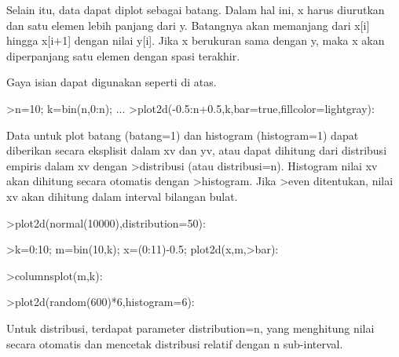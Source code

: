\documentclass{article}
\begin{document}
\begin{eulernotebook}
\begin{eulercomment}
\begin{eulercomment}
\begin{eulercomment}
\begin{eulercomment}
\begin{eulercomment}
\begin{eulercomment}
\begin{eulerprompt}
\end{eulerprompt}
\begin{eulercomment}
Selain  itu,  data  dapat  diplot  sebagai  batang.  Dalam  hal  ini,
x harus  diurutkan  dan  satu  elemen  lebih  panjang  dari  y.
Batangnya akan memanjang  dari  x[i]  hingga  x[i+1]  dengan  nilai
y[i].  Jika  x  berukuran  sama  dengan  y,  maka  x  akan
diperpanjang  satu elemen dengan spasi  terakhir.

Gaya  isian  dapat  digunakan  seperti  di  atas.
\end{eulercomment}
\begin{eulerprompt}
>n=10; k=bin(n,0:n); ...
>plot2d(-0.5:n+0.5,k,bar=true,fillcolor=lightgray):
\end{eulerprompt}
\begin{eulercomment}
Data  untuk  plot  batang  (batang=1)  dan  histogram  (histogram=1)
dapat  diberikan  secara  eksplisit  dalam  xv  dan  yv,  atau  dapat
dihitung dari  distribusi  empiris  dalam  xv  dengan  \textgreater{}distribusi
(atau  distribusi=n).  Histogram  nilai  xv  akan  dihitung  secara
otomatis  dengan \textgreater{}histogram.  Jika  \textgreater{}even  ditentukan,  nilai  xv
akan  dihitung  dalam  interval  bilangan  bulat.
\end{eulercomment}
\begin{eulerprompt}
>plot2d(normal(10000),distribution=50):
\end{eulerprompt}
\begin{eulerprompt}
>k=0:10; m=bin(10,k); x=(0:11)-0.5; plot2d(x,m,>bar):
\end{eulerprompt}
\begin{eulerprompt}
>columnsplot(m,k):
\end{eulerprompt}
\begin{eulerprompt}
>plot2d(random(600)*6,histogram=6):
\end{eulerprompt}
\begin{eulercomment}
Untuk  distribusi,  terdapat  parameter  distribution=n,  yang
menghitung  nilai  secara  otomatis  dan  mencetak  distribusi
relatif  dengan  n  sub-interval.
\end{eulercomment}

\end{eulercomment}
\end{eulercomment}
\end{eulercomment}
\end{eulercomment}
\end{eulercomment}
\end{eulercomment}
\end{eulernotebook}
\end{document}
